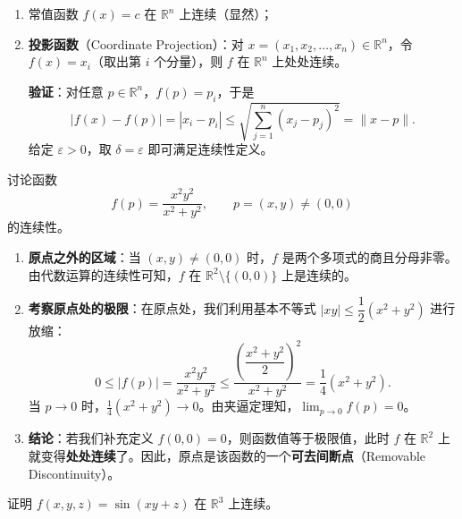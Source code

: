\documentclass[lang=cn,11pt]{elegantbook}
\begin{document}
\begin{exercise}[基本连续函数类] \label{ex:basic-continuous}
\begin{enumerate}
  \item[(1)] 常值函数 $f(x)=c$ 在 $\mathbb{R}^n$ 上连续（显然）；
  \item[(2)] \textbf{投影函数}（Coordinate Projection）：对 $x=(x_1,x_2,\dots,x_n)\in\mathbb{R}^n$，令 $f(x)=x_i$（取出第 $i$ 个分量），则 $f$ 在 $\mathbb{R}^n$ 上处处连续。

  \textbf{验证}：对任意 $p\in\mathbb{R}^n$，$f(p)=p_i$，于是
  \[
  |f(x)-f(p)|=|x_i-p_i|\leq\sqrt{\sum_{j=1}^{n}(x_j-p_j)^2}=\|x-p\|.
  \]
  给定 $\varepsilon>0$，取 $\delta=\varepsilon$ 即可满足连续性定义。
\end{enumerate}
\end{exercise}

\begin{exercise}[可去间断点] \label{ex:removable-disc}
讨论函数
\[
f(p)=\frac{x^2y^2}{x^2+y^2},\qquad p=(x,y) \neq (0,0)
\]
的连续性。
\end{exercise}

\begin{solution}
\begin{enumerate}
  \item \textbf{原点之外的区域}：当 $(x,y) \neq (0,0)$ 时，$f$ 是两个多项式的商且分母非零。由代数运算的连续性可知，$f$ 在 $\mathbb{R}^2\setminus\{(0,0)\}$ 上是连续的。
  \item \textbf{考察原点处的极限}：在原点处，我们利用基本不等式 $|xy|\leq\dfrac12(x^2+y^2)$ 进行放缩：
  \[
  0\leq|f(p)|=\frac{x^2y^2}{x^2+y^2}\leq\frac{\left(\dfrac{x^2+y^2}{2}\right)^{\!2}}{x^2+y^2}=\frac14(x^2+y^2).
  \]
  当 $p\to 0$ 时，$\frac14(x^2+y^2) \to 0$。由夹逼定理知，$\displaystyle\lim_{p\to 0}f(p)=0$。
  \item \textbf{结论}：若我们补充定义 $f(0,0)=0$，则函数值等于极限值，此时 $f$ 在 $\mathbb{R}^2$ 上就变得\textbf{处处连续}了。因此，原点是该函数的一个\textbf{可去间断点}（Removable Discontinuity）。
\end{enumerate}
\end{solution}

\begin{exercise}[复合函数的连续性] \label{ex:composite-continuous}
证明 $f(x,y,z)=\sin(xy+z)$ 在 $\mathbb{R}^3$ 上连续。
\end{exercise}
\end{document}
